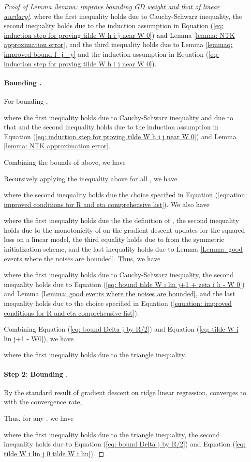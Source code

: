 \documentclass{article} \usepackage{iclr2023/iclr2023_conference,times}
\begin{document}
\begin{proof}[Proof of Lemma \ref{lemma: improve bounding GD weight and that of linear auxilary}]
where the first inequality holds due to Cauchy-Schwarz inequality, the second inequality holds due to the induction assumption in Equation (\ref{eq: induction step for proving tilde W h i j near W 0}) and Lemma \ref{lemma: NTK approximation error}, and the third inequality holds due to Lemma \ref{lemmaq: improved bound f_j - y} and the induction assumption in Equation (\ref{eq: induction step for proving tilde W h i j near W 0}). 
\paragraph{Bounding .} For bounding ,

where the first inequality holds due to Cauchy-Schwarz inequality and due to that  and the second inequality holds due to the induction assumption in Equation (\ref{eq: induction step for proving tilde W h i j near W 0}) and Lemma \ref{lemma: NTK approximation error}. 

Combining the bounds of  above, we have 

Recursively applying the inequality above for all , we have 

where the second inequality holds due the choice specified in Equation (\ref{equation: improved conditions for R and eta comprehensive list}). We also have 

where the first inequality holds due the the definition of , the second inequality holds due to the monotonicity of  on the gradient descent updates  for the squared loss on a linear model, the third equality holds due to  from the symmetric initialization scheme, and the last inequality holds due to Lemma \ref{Lemma: good events where the noises are bounded}. Thus, we have

where the first inequality holds due to Cauchy-Schwarz inequality, the second inequality holds due to Equation (\ref{eq: bound tilde W i lin j+1 + zeta i h - W 0}) and Lemma \ref{Lemma: good events where the noises are bounded}, and the last inequality holds due to the choice specified in Equation (\ref{equation: improved conditions for R and eta comprehensive list}). 

Combining Equation (\ref{eq: bound Delta j by R/2}) and Equation (\ref{eq: tilde W i lin j+1 - W0}), we have 

where the first inequality holds due to the triangle inequality. 
\paragraph{Step 2: Bounding .} By the standard result of gradient descent on ridge linear regression,  converges to  with the convergence rate, 

Thus, for any , we have 

where the first inequality holds due to the triangle inequality, the second inequality holds due to Equation (\ref{eq: bound Delta j by R/2}) and Equation (\ref{eq: tilde W i lin j 0 tilde W i lin}). 
\end{proof}
\end{document}
